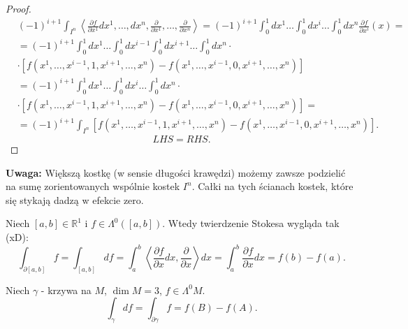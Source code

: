 \documentclass[../main.tex]{subfiles}
\begin{document}
\begin{proof}
\begin{align*}
    &(-1)^{i+1} \int_{I^n}\left< \frac{\partial f}{\partial x^1} dx^1,\ldots,dx^n, \frac{\partial }{\partial x^1} , \ldots, \frac{\partial }{\partial x^n}  \right> = (-1)^{i+1} \int_0^1dx^1\ldots\int_0^1 dx^i\ldots\int_0^1dx^n \frac{\partial f}{\partial x^i} (x) =\\
    &= (-1)^{i+1} \int_0^1dx^1\ldots\int_0^1dx^{i-1}\int_0^1dx^{i+1}\ldots\int_0^1dx^n\cdot  \\
    &\cdot \left[ f(x^1,\ldots,x^{i-1},1,x^{i+1},\ldots,x^n) - f(x^1,\ldots,x^{i-1}, 0, x^{i+1}, \ldots, x^n) \right]  \\
    &= (-1)^{i+1}\int_0^1dx^1\ldots\int_0^1dx^i\ldots\int_0^1dx^n\cdot \\
    &\cdot \left[ f(x^1,\ldots,x^{i-1},1,x^{i+1},\ldots,x^n) - f(x^1,\ldots,x^{i-1}, 0, x^{i+1}, \ldots, x^n) \right] = \\
    &= (-1)^{i+1} \int_{I^n}\left[ f(x^1,\ldots,x^{i-1},1,x^{i+1},\ldots,x^n) - f(x^1,\ldots,x^{i-1},0,x^{i+1},\ldots,x^n) \right]
.\end{align*}
\[
LHS = RHS
.\]
\end{proof}
\textbf{Uwaga:} Większą kostkę (w sensie długości krawędzi) możemy zawsze podzielić na sumę zorientowanych wspólnie kostek $I^n$. Całki na tych ścianach kostek, które się stykają dadzą w efekcie zero.
\begin{przyklad}
    Niech $[a,b]\in \mathbb{R}^1$ i $f\in \Lambda^0\left( [a,b] \right) $. Wtedy twierdzenie Stokesa wygląda tak (xD):
    \[
        \int_{\partial[a,b]} f= \int_{[a,b]} df = \int_a^b \left<\frac{\partial f}{\partial x}dx , \frac{\partial }{\partial x}  \right>dx = \int_a^b \frac{\partial f}{\partial x} dx = f(b) - f(a)
    .\]
\end{przyklad}
\begin{przyklad}
    Niech $\gamma$ - krzywa na $M$, $\dim M = 3$, $f \in \Lambda^0M$.
     \[
         \int_\gamma df= \int_{\partial \gamma} f = f(B) - f(A)
    .\]
\end{przyklad}
\end{document}
